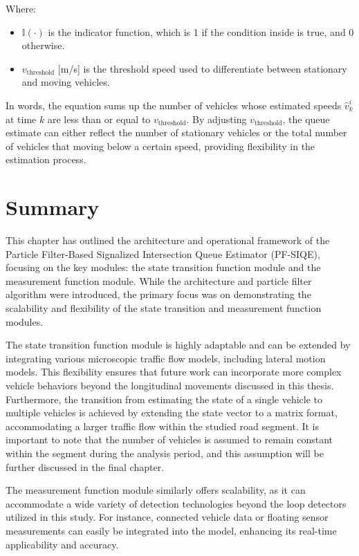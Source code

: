 Where:
\begin{itemize}
    \item \(\mathbb{I}(\cdot)\) is the indicator function, which is 1 if the condition inside is true, and 0 otherwise.
    \item \(v_\text{threshold}\) [m/s] is the threshold speed used to differentiate between stationary and moving vehicles.
\end{itemize}

In words, the equation sums up the number of vehicles whose estimated speeds $\hat v_k^i$ at time \(k\) are less than or equal to \(v_\text{threshold}\). By adjusting \(v_\text{threshold}\), the queue estimate can either reflect the number of stationary vehicles or the total number of vehicles that moving below a certain speed, providing flexibility in the estimation process.

\section{Summary}
This chapter has outlined the architecture and operational framework of the Particle Filter-Based Signalized Intersection Queue Estimator (PF-SIQE), focusing on the key modules: the state transition function module and the measurement function module. While the architecture and particle filter algorithm were introduced, the primary focus was on demonstrating the scalability and flexibility of the state transition and measurement function modules.

The state transition function module is highly adaptable and can be extended by integrating various microscopic traffic flow models, including lateral motion models. This flexibility ensures that future work can incorporate more complex vehicle behaviors beyond the longitudinal movements discussed in this thesis. Furthermore, the transition from estimating the state of a single vehicle to multiple vehicles is achieved by extending the state vector to a matrix format, accommodating a larger traffic flow within the studied road segment. It is important to note that the number of vehicles is assumed to remain constant within the segment during the analysis period, and this assumption will be further discussed in the final chapter.

The measurement function module similarly offers scalability, as it can accommodate a wide variety of detection technologies beyond the loop detectors utilized in this study. For instance, connected vehicle data or floating sensor measurements can easily be integrated into the model, enhancing its real-time applicability and accuracy.

